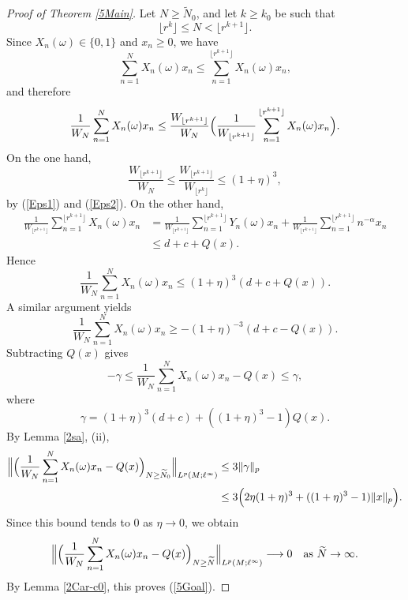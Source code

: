 \documentclass[12pt]{amsart}
\newcommand{\norm}[1]{\Vert#1\Vert}
\theoremstyle{remark}
\theoremstyle{definition}
\numberwithin{equation}{section}
\begin{document}
\begin{proof}[Proof of Theorem \ref{5Main}]
Let $N\geq \widetilde{N}_0$, and let $k\geq k_0$ be such that
\[
\lfloor r^k \rfloor \leq N < \lfloor r^{k+1} \rfloor.
\]
Since $X_n(\omega)\in\{0,1\}$ and $x_n\geq 0$, we have
\[
\sum_{n=1}^N X_n(\omega)x_n \leq \sum_{n=1}^{\lfloor r^{k+1}\rfloor} X_n(\omega)x_n,
\]
and therefore
\[
\frac{1}{W_N}\sum_{n=1}^N X_n(\omega)x_n
\leq \frac{W_{\lfloor r^{k+1}\rfloor}}{W_N}
\Bigl(\frac{1}{W_{\lfloor r^{k+1}\rfloor}}
\sum_{n=1}^{\lfloor r^{k+1}\rfloor} X_n(\omega)x_n\Bigr).
\]
On the one hand,
\[
\frac{W_{\lfloor r^{k+1}\rfloor}}{W_N}
\leq \frac{W_{\lfloor r^{k+1}\rfloor}}{W_{\lfloor r^k\rfloor}}
\leq (1+\eta)^3,
\]
by (\ref{Eps1}) and (\ref{Eps2}). On the other hand,
\begin{align*}
\frac{1}{W_{\lfloor r^{k+1}\rfloor}}
\sum_{n=1}^{\lfloor r^{k+1}\rfloor} X_n(\omega)x_n
&= \frac{1}{W_{\lfloor r^{k+1}\rfloor}}
\sum_{n=1}^{\lfloor r^{k+1}\rfloor} Y_n(\omega)x_n
+ \frac{1}{W_{\lfloor r^{k+1}\rfloor}}
\sum_{n=1}^{\lfloor r^{k+1}\rfloor} n^{-\alpha}x_n\\
&\leq d+c+Q(x).
\end{align*}
Hence
\[
\frac{1}{W_N}\sum_{n=1}^N X_n(\omega)x_n
\leq (1+\eta)^3(d+c+Q(x)).
\]
A similar argument yields
\[
\frac{1}{W_N}\sum_{n=1}^N X_n(\omega)x_n
\geq -(1+\eta)^{-3}(d+c-Q(x)).
\]
Subtracting $Q(x)$ gives
\[
-\gamma \leq \frac{1}{W_N}\sum_{n=1}^N X_n(\omega)x_n - Q(x) \leq \gamma,
\]
where
\[
\gamma = (1+\eta)^3(d+c) + ((1+\eta)^3-1)Q(x).
\]
By Lemma \ref{2sa}, (ii),
\begin{align*}
\Big\|\Bigl(\frac{1}{W_N}\sum_{n=1}^N X_n(\omega)x_n - Q(x)\Bigr)_{N\geq \widetilde{N}_0}\Big\|_{L^p(M;\ell^\infty)}
&\leq 3\norm{\gamma}_p\\
&\leq 3\Bigl(2\eta(1+\eta)^3 + ((1+\eta)^3-1)\norm{x}_p\Bigr).
\end{align*}
Since this bound tends to $0$ as $\eta\to 0$, we obtain
\[
\Big\|\Bigl(\frac{1}{W_N}\sum_{n=1}^N X_n(\omega)x_n - Q(x)\Bigr)_{N\geq \widetilde{N}}\Big\|_{L^p(M;\ell^\infty)}
\longrightarrow 0 \quad \text{as } \widetilde{N}\to\infty.
\]
By Lemma \ref{2Car-c0}, this proves (\ref{5Goal}).


\end{proof}
\end{document}
